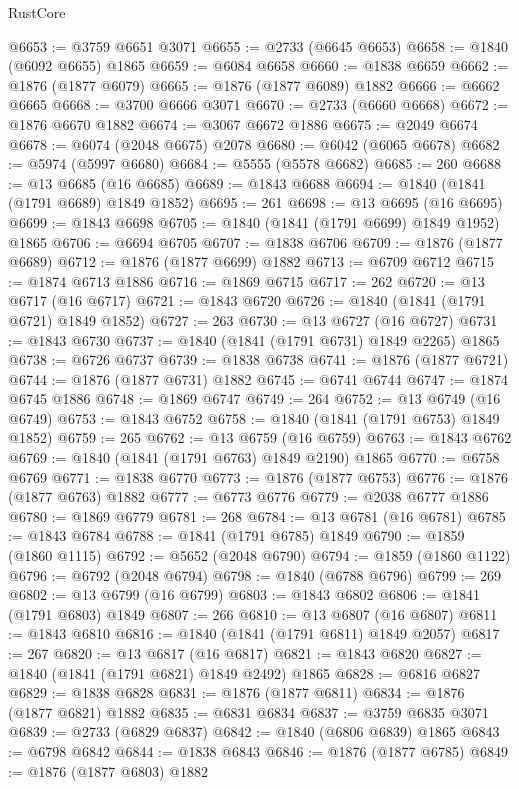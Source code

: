 \begin{lexlean}{RustCore}
\begin{coremodule}
@6653 := @3759 @6651 @3071
@6655 := @2733 (@6645 @6653)
@6658 := @1840 (@6092 @6655) @1865
@6659 := @6084 @6658
@6660 := @1838 @6659
@6662 := @1876 (@1877 @6079)
@6665 := @1876 (@1877 @6089) @1882
@6666 := @6662 @6665
@6668 := @3700 @6666 @3071
@6670 := @2733 (@6660 @6668)
@6672 := @1876 @6670 @1882
@6674 := @3067 @6672 @1886
@6675 := @2049 @6674
@6678 := @6074 (@2048 @6675) @2078
@6680 := @6042 (@6065 @6678)
@6682 := @5974 (@5997 @6680)
@6684 := @5555 (@5578 @6682)
@6685 := 260
@6688 := @13 @6685 (@16 @6685)
@6689 := @1843 @6688
@6694 := @1840 (@1841 (@1791 @6689) @1849 @1852)
@6695 := 261
@6698 := @13 @6695 (@16 @6695)
@6699 := @1843 @6698
@6705 := @1840 (@1841 (@1791 @6699) @1849 @1952) @1865
@6706 := @6694 @6705
@6707 := @1838 @6706
@6709 := @1876 (@1877 @6689)
@6712 := @1876 (@1877 @6699) @1882
@6713 := @6709 @6712
@6715 := @1874 @6713 @1886
@6716 := @1869 @6715
@6717 := 262
@6720 := @13 @6717 (@16 @6717)
@6721 := @1843 @6720
@6726 := @1840 (@1841 (@1791 @6721) @1849 @1852)
@6727 := 263
@6730 := @13 @6727 (@16 @6727)
@6731 := @1843 @6730
@6737 := @1840 (@1841 (@1791 @6731) @1849 @2265) @1865
@6738 := @6726 @6737
@6739 := @1838 @6738
@6741 := @1876 (@1877 @6721)
@6744 := @1876 (@1877 @6731) @1882
@6745 := @6741 @6744
@6747 := @1874 @6745 @1886
@6748 := @1869 @6747
@6749 := 264
@6752 := @13 @6749 (@16 @6749)
@6753 := @1843 @6752
@6758 := @1840 (@1841 (@1791 @6753) @1849 @1852)
@6759 := 265
@6762 := @13 @6759 (@16 @6759)
@6763 := @1843 @6762
@6769 := @1840 (@1841 (@1791 @6763) @1849 @2190) @1865
@6770 := @6758 @6769
@6771 := @1838 @6770
@6773 := @1876 (@1877 @6753)
@6776 := @1876 (@1877 @6763) @1882
@6777 := @6773 @6776
@6779 := @2038 @6777 @1886
@6780 := @1869 @6779
@6781 := 268
@6784 := @13 @6781 (@16 @6781)
@6785 := @1843 @6784
@6788 := @1841 (@1791 @6785) @1849
@6790 := @1859 (@1860 @1115)
@6792 := @5652 (@2048 @6790)
@6794 := @1859 (@1860 @1122)
@6796 := @6792 (@2048 @6794)
@6798 := @1840 (@6788 @6796)
@6799 := 269
@6802 := @13 @6799 (@16 @6799)
@6803 := @1843 @6802
@6806 := @1841 (@1791 @6803) @1849
@6807 := 266
@6810 := @13 @6807 (@16 @6807)
@6811 := @1843 @6810
@6816 := @1840 (@1841 (@1791 @6811) @1849 @2057)
@6817 := 267
@6820 := @13 @6817 (@16 @6817)
@6821 := @1843 @6820
@6827 := @1840 (@1841 (@1791 @6821) @1849 @2492) @1865
@6828 := @6816 @6827
@6829 := @1838 @6828
@6831 := @1876 (@1877 @6811)
@6834 := @1876 (@1877 @6821) @1882
@6835 := @6831 @6834
@6837 := @3759 @6835 @3071
@6839 := @2733 (@6829 @6837)
@6842 := @1840 (@6806 @6839) @1865
@6843 := @6798 @6842
@6844 := @1838 @6843
@6846 := @1876 (@1877 @6785)
@6849 := @1876 (@1877 @6803) @1882

\end{coremodule}
\end{lexlean}
